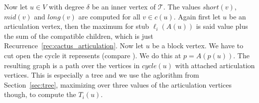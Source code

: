 \documentclass[a4paper,english,numberwithinsect]{eurocg18}
\newcommand{\maxsped}{\ensuremath{\textsc{MaxSPED}}\xspace}
\newcommand{\sollong}{\ensuremath{\textit{long}}\xspace}
\newcommand{\solmid}{\ensuremath{\textit{mid}}\xspace}
\newcommand{\solshort}{\ensuremath{\textit{short}}\xspace}
\begin{document}
Now let $ u \in V $ with degree $ \delta $ be an inner vertex of $ \mathcal T $. The values $ \solshort(v) $, $ \solmid(v) $ and $ \sollong(v) $ are computed for all $ v \in c(u) $. Again first let $ u $ be an articulation vertex, then the maximum for stub $ \ell_i(A(u)) $ is said value plus the sum of the compatible children, which is just Recurrence~\ref{rec:cactus_articulation}. Now let $ u $ be a block vertex. We have to cut open the cycle it represents (compare \cite{bcgkmn-pped-17}). We do this at $ p = A(p(u)) $. The resulting graph is a path over the vertices in $ \textit{cycle}(u) $ with attached articulation vertices. This is especially a tree and we use the aglorithm from Section~\ref{sec:tree}, maximizing over three values of the articulation vertices though,  to compute the $ T_i(u) $.
%
\end{document}
